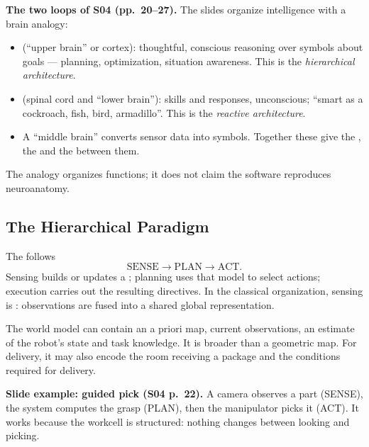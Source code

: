 \textbf{The two loops of S04 (pp.~20--27).} The slides organize intelligence with a brain analogy:
\begin{itemize}
\item {} (``upper brain'' or cortex): thoughtful, conscious reasoning over symbols about goals --- planning, optimization, situation awareness. This is the \emph{hierarchical architecture}.
\item {} (spinal cord and ``lower brain''): skills and responses, unconscious; ``smart as a cockroach, fish, bird, armadillo''. This is the \emph{reactive architecture}.
\item A ``middle brain'' converts sensor data into symbols. Together these give the , the  and the  between them.
\end{itemize}
The analogy organizes functions; it does not claim the software reproduces neuroanatomy.

\subsection{The Hierarchical Paradigm}
The  follows
\[
 \text{SENSE}\longrightarrow\text{PLAN}\longrightarrow\text{ACT}.
\]
Sensing builds or updates a ; planning uses that model to select actions; execution carries out the resulting directives. In the classical organization, sensing is : observations are fused into a shared global representation.

The world model can contain an a priori map, current observations, an estimate of the robot's state and task knowledge. It is broader than a geometric map. For delivery, it may also encode the room receiving a package and the conditions required for delivery.

\textbf{Slide example: guided pick (S04 p.~22).} A camera observes a part (SENSE), the system computes the grasp (PLAN), then the manipulator picks it (ACT). It works because the workcell is structured: nothing changes between looking and picking.

